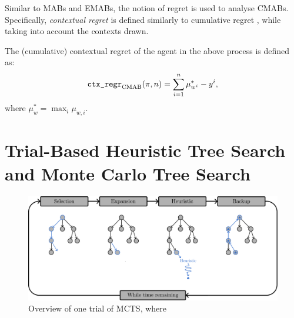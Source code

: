         Similar to MABs and EMABs, the notion of regret is used to analyse CMABs. Specifically, \textit{contextual regret} is defined similarly to cumulative regret , while taking into account the contexts drawn.

        \begin{defn}
            The \textnormal{(cumulative) contextual regret} of the agent in the above process is defined as:
            \begin{align}
                {\textnormal{\texttt{ctx\_regr}}}_{{\textnormal{CMAB}}}(\pi,n) = \sum_{i=1}^n \mu_{w^i}^* - y^i,
            \end{align}
            where $\mu_{w}^* = \max_i \mu_{w,i}$.
        \end{defn}



        














\section{Trial-Based Heuristic Tree Search and Monte Carlo Tree Search}
\label{sec:2-4-thts}

    \begin{figure}
        \centering\includegraphics[width=1.0\textwidth]{figures/ch2/mcts_trial.pdf} 
        \caption[Overview of one trial of MCTS.]{Overview of one trial of MCTS, where }
        \label{fig:mcts}
    \end{figure}

